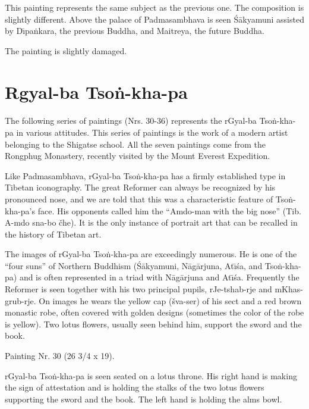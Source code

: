 \documentclass[a4paper, 12pt, oneside]{article}
\begin{document}
\bigskip

This painting represents the same subject as the previous one. The composition is slightly different. Above the palace of Padmasambhava is seen \'{S}\={a}kyamuni assisted by D\={\i}pa\.{n}kara, the previous Buddha, and Maitreya, the future Buddha.

The painting is slightly damaged. 

\clearpage
\section{Rgyal-ba Tso\.{n}-kha-pa}
\paragraph{}
The following series of paintings (Nrs. 30-36) represents the rGyal-ba Tso\.{n}-kha-pa in various attitudes. This series of paintings is the work of a modern artist belonging to the Shigatse school. All the seven paintings come from the Rongphug Monastery, recently visited by the Mount Everest Expedition.

Like Padmasambhava, rGyal-ba Tso\.{n}-kha-pa has a firmly established type in Tibetan iconography. The great Reformer can always be recognized by his pronounced nose, and we are told that this was a characteristic feature of Tso\.{n}-kha-pa's face. His opponents called him the ``Amdo-man with the big nose'' (Tib. A-mdo sna-bo čhe). It is the only instance of portrait art that can be recalled in the history of Tibetan art.

The images of rGyal-ba Tso\.{n}-kha-pa are exceedingly numerous. He is one of the ``four suns'' of Northern Buddhism (\'{S}\={a}kyamuni, N\={a}g\={a}rjuna, At\={\i}\'{s}a, and Tso\.{n}-kha-pa) and is often represented in a triad with N\={a}g\={a}rjuna and At\={\i}\'{s}a. Frequently the Reformer is seen together with his two principal pupils, rJe-tshab-rje and mKhas-grub-rje. On images he wears the yellow cap (šva-ser) of his sect and a red brown monastic robe, often covered with golden designs (sometimes the color of the robe is yellow). Two lotus flowers, usually seen behind him, support the sword and the book.

\bigskip

Painting Nr. 30 (26 3/4 x 19).

\bigskip

rGyal-ba Tso\.{n}-kha-pa is seen seated on a lotus throne. His right hand is making the sign of attestation and is holding the stalks of the two lotus flowers supporting the sword and the book. The left hand is holding the alms bowl.
\end{document}
